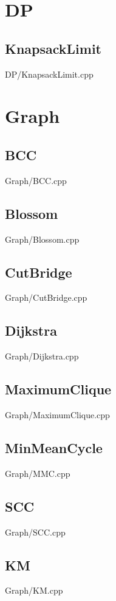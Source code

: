 \section{DP}
    \subsection{KnapsackLimit}
         {DP/KnapsackLimit.cpp}
    

\section{Graph}
    \subsection{BCC}
         {Graph/BCC.cpp}
    \subsection{Blossom}
         {Graph/Blossom.cpp}
    \subsection{CutBridge}
         {Graph/CutBridge.cpp}
    \subsection{Dijkstra}
         {Graph/Dijkstra.cpp}
    \subsection{MaximumClique}
         {Graph/MaximumClique.cpp}
    \subsection{MinMeanCycle}
         {Graph/MMC.cpp}
    \subsection{SCC}
         {Graph/SCC.cpp}
    \subsection{KM}
         {Graph/KM.cpp}
